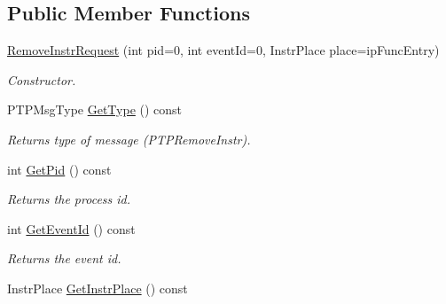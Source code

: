 \subsection*{Public Member Functions}
\begin{DoxyCompactItemize}
\item 
\hyperlink{class_common_1_1_remove_instr_request_ad11aa72688176348501ac84364fb4784}{Remove\-Instr\-Request} (int pid=0, int event\-Id=0, Instr\-Place place=ip\-Func\-Entry)
\begin{DoxyCompactList}\small\item\em Constructor. \end{DoxyCompactList}\item 
\hypertarget{class_common_1_1_remove_instr_request_a23c844af4a248eae68aac682df45fe0e}{P\-T\-P\-Msg\-Type \hyperlink{class_common_1_1_remove_instr_request_a23c844af4a248eae68aac682df45fe0e}{Get\-Type} () const }\label{class_common_1_1_remove_instr_request_a23c844af4a248eae68aac682df45fe0e}

\begin{DoxyCompactList}\small\item\em Returns type of message (P\-T\-P\-Remove\-Instr). \end{DoxyCompactList}\item 
\hypertarget{class_common_1_1_remove_instr_request_a8bd7683fc30ee5f5fb531c2422e6a535}{int \hyperlink{class_common_1_1_remove_instr_request_a8bd7683fc30ee5f5fb531c2422e6a535}{Get\-Pid} () const }\label{class_common_1_1_remove_instr_request_a8bd7683fc30ee5f5fb531c2422e6a535}

\begin{DoxyCompactList}\small\item\em Returns the process id. \end{DoxyCompactList}\item 
\hypertarget{class_common_1_1_remove_instr_request_a53090f42338ccb963d38799b0cc4ef4b}{int \hyperlink{class_common_1_1_remove_instr_request_a53090f42338ccb963d38799b0cc4ef4b}{Get\-Event\-Id} () const }\label{class_common_1_1_remove_instr_request_a53090f42338ccb963d38799b0cc4ef4b}

\begin{DoxyCompactList}\small\item\em Returns the event id. \end{DoxyCompactList}\item 
\hypertarget{class_common_1_1_remove_instr_request_af6bd2c0ffb341be5427e04de01140a8c}{Instr\-Place \hyperlink{class_common_1_1_remove_instr_request_af6bd2c0ffb341be5427e04de01140a8c}{Get\-Instr\-Place} () const }\label{class_common_1_1_remove_instr_request_af6bd2c0ffb341be5427e04de01140a8c}


\end{DoxyCompactItemize}
